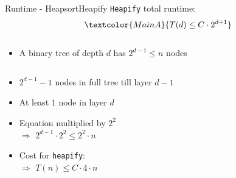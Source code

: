 \begin{frame}{Runtime - Heapsort}{Heapify}
  \texttt{Heapify} total runtime:
  \begin{displaymath}
    \textcolor{MainA}{T(d) \leq C \cdot 2^{d + 1}}
  \end{displaymath}
  \vspace{-1em}
  \begin{columns}
    \begin{column}{\linewidth}
      \begin{itemize}
        \item<2- |handout:1>
        A binary tree of depth {\color{MainA}$d$} has
        {\color{MainA}$2^{d-1} \leq n$} nodes
      \end{itemize}
    \end{column}
    \begin{column}{0pt}\end{column} %
  \end{columns}
  \begin{columns}
    \begin{column}[t]{0.5\linewidth}
      \begin{itemize}
        \item<5- |handout:1>
          {\color{MainB}$2^{d-1} - 1$} nodes in full tree till layer
          {\color{MainB}$d - 1$}
        \item<6- |handout:1>
          At least {\color{MainA}$1$} node in layer {\color{MainA}$d$}
          \vspace{1.0em}
        \item<7- |handout:1>
          {\color{Hint}Equation multiplied by $2^2$}\\
          $\Rightarrow$ {\color{MainA}$2^{d-1} \cdot 2^2 \leq 2^2 \cdot n$}
        \item<8- |handout:1>
          Cost for \texttt{heapify}:\\
          $\Rightarrow$ {\color{MainA}$T(n) \leq C \cdot 4 \cdot n$}
      \end{itemize}
    \end{column}
    \begin{column}[t]{0.5\linewidth}
    \end{column}
  \end{columns}
\end{frame}
